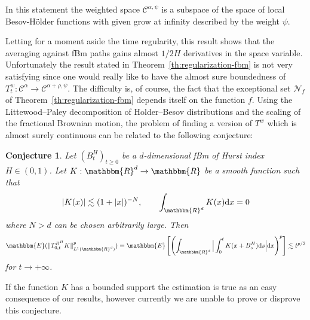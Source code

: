 \documentclass[a4paper,11pt]{article}
\newcommand{\mathd}{\mathrm{d}}
\newtheorem{conjecture}[theorem]{Conjecture}
\newcommand{\CC}{\mathscr C}
\newcommand{\CN}{\mathscr N}
\begin{document}
In this statement the weighted space $\CC^{\alpha , \psi}$ is a subspace of
the space of local Besov-H\"older functions with given grow at infinity
described by the weight $\psi$.



Letting for a moment aside the time regularity, this result shows that the
averaging against fBm paths gains almost $1/2H$ derivatives in the space
variable. Unfortunately the result stated in
Theorem~\ref{th:regularization-fbm} is not very satisfying since one would
really like to have the almost sure boundedness of $T^{w}_{t} : \CC^{\alpha}
\rightarrow \CC^{\alpha + \rho , \psi}$. The difficulty is, of course, the
fact that the exceptional set $\CN_{f}$ of
Theorem~\ref{th:regularization-fbm} depends itself on the function $f$. Using
the Littewood--Paley decomposition of Holder--Besov distributions and the
scaling of the fractional Brownian motion, the problem of finding a version of
$T^{w}$ which is almost surely continuous can be related to the following
conjecture:

\begin{conjecture}
  Let $(B^{H}_{t} )_{t \geqslant 0}$ be a $d$-dimensional fBm of Hurst index
  $H \in ( 0,1 )$. Let $K:\mathbbm{R}^{d} \rightarrow \mathbbm{R}$ be a smooth
  function such that
  \[ | K ( x ) | \lesssim ( 1+ | x | )^{-N} , \hspace{2em}
     \int_{\mathbbm{R}^{d}} K ( x ) \mathd x=0 \]
  where $N>d$ can be chosen arbitrarily large. Then
  \[ \mathbbm{E} ( \| T^{B^{H}}_{0,t} K \|_{L^{1} ( \mathbbm{R}^{d} )}^{p} )
     =\mathbbm{E} \left[ \left( \int_{\mathbbm{R}^{d}} \Big\lvert \int_{0}^{t} K (
     x+B^{H}_{s} ) \mathd s \Big\lvert \mathd x \right)^{p} \right] \lesssim
     t^{p/2} \]
  for $t \rightarrow + \infty$.
\end{conjecture}

If the function $K$ has a bounded support the estimation is true as an easy
consequence of our results, however currently we are unable to prove or
disprove this conjecture.
\end{document}
